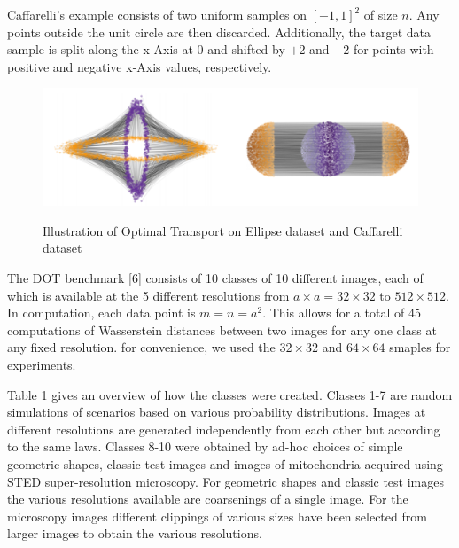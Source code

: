 Caffarelli's example consists of two uniform samples on $[-1, 1]^2$ of size $n$. Any points outside the unit circle are then
discarded. Additionally, the target data sample is split along the x-Axis at $0$ and shifted by
$+2$ and $-2$ for points with positive and negative x-Axis values, respectively.

\begin{figure}[htbp]
    \centering
    \includegraphics[width=0.6\linewidth]{img/ellipse_caffa}
    \label{fig:ot}
    \caption{Illustration of Optimal Transport on Ellipse dataset and Caffarelli dataset}
  \end{figure}

The DOT benchmark [6] consists of 10 classes of 10 different images, each of which is available at the 5 different
resolutions from $a \times a  = 32 \times 32$ to $512 \times 512$. In computation, each data point is $m = n = a^2$.  This allows
for a total of 45 computations of Wasserstein distances between two images for any one class at any fixed resolution. for convenience, we used the $32 \times 32$ and $64 \times 64$ smaples for experiments.

Table 1 gives an overview of how the classes were created.
Classes 1-7 are random simulations of scenarios based on various probability distributions.
Images at different resolutions are generated independently from each other but according to the same laws.
Classes 8-10 were obtained by ad-hoc choices of simple geometric shapes, classic test images and images of mitochondria acquired using STED
super-resolution microscopy. For geometric shapes and classic test images
the various resolutions available are coarsenings of a single image. For the microscopy
images different clippings of various sizes have been selected from larger images to obtain
the various resolutions.

